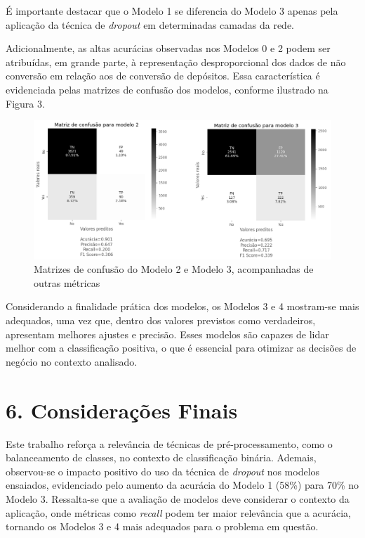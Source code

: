 \documentclass[
  onecolumn]{article}
\begin{document}
É importante destacar que o Modelo 1 se diferencia do Modelo 3 apenas
pela aplicação da técnica de \emph{dropout} em determinadas camadas da
rede.

Adicionalmente, as altas acurácias observadas nos Modelos 0 e 2 podem
ser atribuídas, em grande parte, à representação desproporcional dos
dados de não conversão em relação aos de conversão de depósitos. Essa
característica é evidenciada pelas matrizes de confusão dos modelos,
conforme ilustrado na Figura 3.

\begin{figure}[H]

{\centering \includegraphics[width=1.1\textwidth,height=\textheight]{cf_matrix.png}

}

\caption{Matrizes de confusão do Modelo 2 e Modelo 3, acompanhadas de
outras métricas}

\end{figure}%

Considerando a finalidade prática dos modelos, os Modelos 3 e 4
mostram-se mais adequados, uma vez que, dentro dos valores previstos
como verdadeiros, apresentam melhores ajustes e precisão. Esses modelos
são capazes de lidar melhor com a classificação positiva, o que é
essencial para otimizar as decisões de negócio no contexto analisado.

\newpage

\section{6. Considerações Finais}\label{considerauxe7uxf5es-finais}

Este trabalho reforça a relevância de técnicas de pré-processamento,
como o balanceamento de classes, no contexto de classificação binária.
Ademais, observou-se o impacto positivo do uso da técnica de
\emph{dropout} nos modelos ensaiados, evidenciado pelo aumento da
acurácia do Modelo 1 (58\%) para 70\% no Modelo 3. Ressalta-se que a
avaliação de modelos deve considerar o contexto da aplicação, onde
métricas como \emph{recall} podem ter maior relevância que a acurácia,
tornando os Modelos 3 e 4 mais adequados para o problema em questão.
\end{document}
